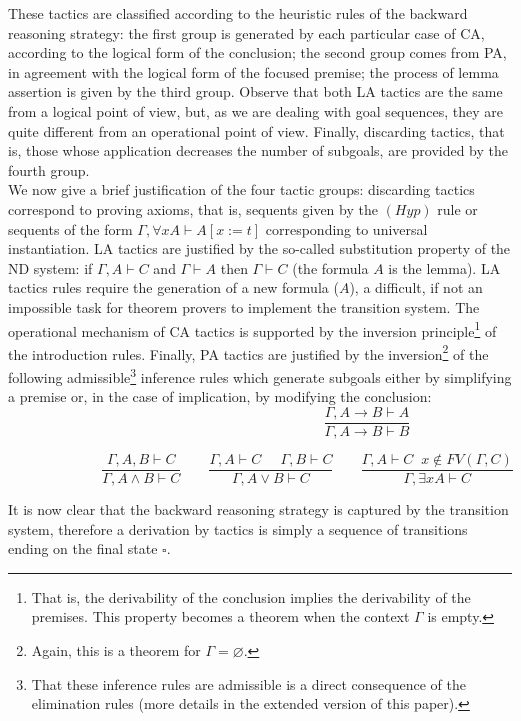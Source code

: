 \documentclass[a4paper,UKenglish]{lipics}
\newcommand{\G}{\Gamma}
\newcommand{\fa}{\forall}
\newcommand{\ex}{\exists}
\begin{document}
These tactics are classified according to the heuristic rules of the backward reasoning strategy: the first group is generated by each particular case of CA, according to the logical form of the conclusion; the second group comes from PA, in agreement with the logical form of the focused premise; the process of lemma assertion is given by the third group.  Observe that both LA tactics are the same from a logical point of view, but, as we are dealing with goal sequences, they are quite different from an operational point of view. Finally, discarding tactics, that is, those whose application decreases the number of subgoals, are provided by the fourth group. \\ 
We now give a brief justification of the four tactic groups: discarding tactics correspond to proving axioms, that is, sequents given by the $(Hyp)$ rule or sequents of the form  $\G,\fa x A\vdash A[x:=t]$ corresponding to universal instantiation.
LA tactics are justified by the so-called substitution property of the ND system: if $\G,A\vdash C$ and $\G\vdash A$ then $\G\vdash C$  (the formula $A$ is the lemma). LA tactics rules require the generation of a new formula ($A$), a difficult, if not an impossible task
for theorem provers to implement the transition system.
The operational mechanism of CA tactics is supported by the inversion principle\footnote{That is, the derivability of the conclusion implies 
the derivability of the premises. This property becomes a theorem when the context $\G$ is empty.} of the introduction rules. Finally, PA tactics are justified by the inversion\footnote{Again, this is a theorem for $\G=\varnothing$.} of the following admissible\footnote{That these inference rules are admissible is a direct consequence of the elimination rules (more details in the extended version of this paper).} inference rules which generate subgoals either by simplifying a premise or, in the case of implication, by modifying the conclusion: 
\[
\mspace{275mu} \frac{\G,A\to B\vdash A}{\G,A\to B\vdash B}
\]

\[
\mspace{120mu}\frac{\G,A,B\vdash C}{\G,A\land B\vdash C}\;\;\;\;\;\;\;
\frac{\G,A\vdash C\;\;\;\;\;\G,B\vdash C}{\G,A\lor B\vdash C} \;\;\;\;\;\;\;  \frac{\G,A\vdash C\;\;x\notin FV(\G,C)}{\G,\ex x A\vdash C} \;\;\;\;\;\;\;\;\;\;\;\;\;\;
\]

\smallskip
It is now clear that the backward reasoning strategy is captured by the transition system, therefore a derivation by tactics is simply a sequence of transitions ending on the final state $\square$. 
\end{document}
